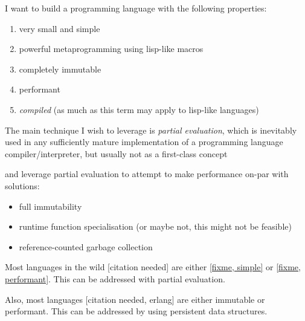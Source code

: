 \documentclass[main.tex]{subfiles}
\begin{document}
I want to build a programming language with the following properties:
\begin{enumerate}
    \item very small and simple
    \item powerful metaprogramming using lisp-like macros
    \item completely immutable
    \item performant
    \item \emph{compiled} (as much as this term may apply to lisp-like languages)
\end{enumerate}

The main technique I wish to leverage is \emph{partial evaluation}, which is
inevitably used in any sufficiently mature implementation of a programming
language compiler/interpreter, but usually not as a first-class concept

 and
leverage partial evaluation to attempt to make performance on-par with
 solutions:
\begin{itemize}
    \item full immutability
    \item runtime function specialisation (or maybe not, this might not be feasible)
    \item reference-counted garbage collection
\end{itemize}

Most languages in the wild [citation needed] are either \ref{fixme, simple} or
\ref{fixme, performant}. This can be addressed with partial evaluation.

Also, most languages [citation needed, erlang] are either immutable or performant.
This can be addressed by using persistent data structures.



\end{document}
